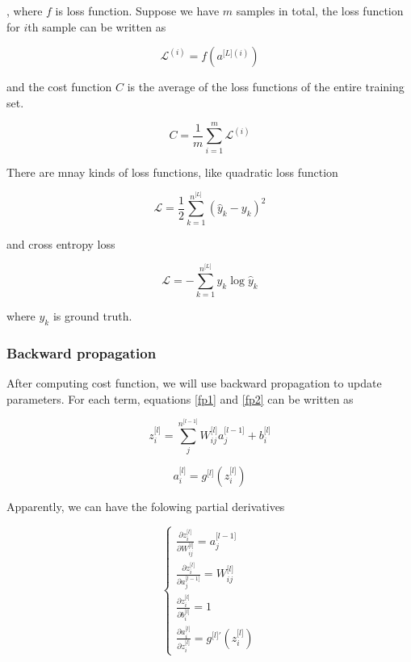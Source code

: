 \documentclass[11pt]{scrartcl} %
\begin{document}
, where $f$ is loss function. Suppose we have $m$ samples in total, the loss function for $i$th sample can be written as 

\begin{equation}
\mathcal L^{(i)}=f(a^{\lbrack L\rbrack(i)})
\end{equation}

and the cost function $C$ is the average of the loss functions of the entire training set.

\begin{equation}
C=\frac1m\sum_{i=1}^m\mathcal L^{(i)}
\label{fp3}
\end{equation}

There are mnay kinds of loss functions, like quadratic loss function

\begin{equation}
\mathcal L=\frac12\sum_{k=1}^{n^{\lbrack L\rbrack}}(\widehat y_k-y_k)^{2}
\end{equation}

and cross entropy loss

\begin{equation}
\mathcal L=-\sum_{k=1}^{n^{\lbrack L\rbrack}}y_k\log{\widehat y}_k
\end{equation}

where $y_k$ is ground truth.


\subsubsection{Backward propagation}

After computing cost function, we will use backward propagation to update parameters. For each term, equations \eqref{fp1} and \eqref{fp2} can be written as

\begin{equation}
z_i^{\lbrack l\rbrack}=\sum_j^{n^{\lbrack l-1\rbrack}}W_{ij}^{\lbrack l\rbrack}a_j^{\lbrack l-1\rbrack}+b_i^{\lbrack l\rbrack}
\end{equation}

\begin{equation}
a_i^{\lbrack l\rbrack}=g^{\lbrack l\rbrack}(z_i^{\lbrack l\rbrack})
\end{equation}

Apparently, we can have the folowing partial derivatives

\begin{equation}
\left\{\begin{array}
{l}\frac{\partial z_i^{\lbrack l\rbrack}}{\partial W_{ij}^{\lbrack l\rbrack}}=a_j^{\lbrack l-1\rbrack}
\\\frac{\partial z_i^{\lbrack l\rbrack}}{\partial a_j^{\lbrack l-1\rbrack}}=W_{ij}^{\lbrack l\rbrack}
\\\frac{\partial z_i^{\lbrack l\rbrack}}{\partial b_i^{\lbrack l\rbrack}}=1
\\\frac{\partial a_i^{\lbrack l\rbrack}}{\partial z_i^{\lbrack l\rbrack}}=g^{{\lbrack l\rbrack}'}(z_i^{\lbrack l\rbrack})
\end{array}\right.
\end{equation}
\end{document}
